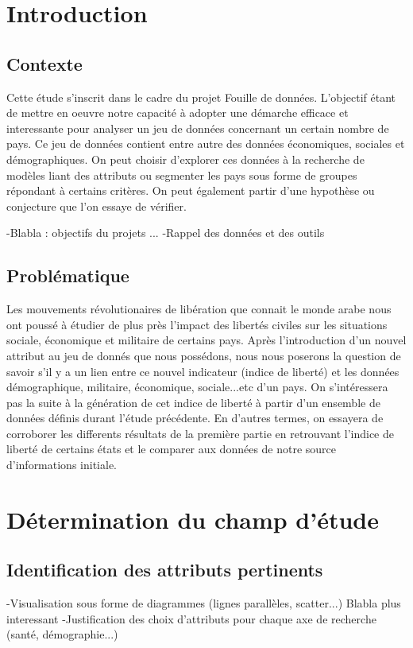 \section{Introduction}

\subsection{Contexte}
Cette étude s'inscrit dans le cadre du projet Fouille de données. L'objectif étant de mettre en oeuvre notre capacité à adopter une démarche efficace et interessante pour analyser un jeu de données concernant un certain nombre de pays.
Ce jeu de données contient entre autre des données économiques, sociales et démographiques. On peut choisir d'explorer ces données à la recherche de modèles liant des attributs ou segmenter les pays sous forme de groupes répondant à certains critères. On peut également partir d'une hypothèse ou conjecture que l'on essaye de vérifier.  

-Blabla : objectifs du projets ...
-Rappel des données et des outils
\subsection{Problématique}
Les mouvements révolutionaires de libération que connait le monde arabe nous ont poussé à étudier de plus près l'impact des libertés civiles sur les situations sociale, économique et militaire de certains pays.
Après l'introduction d'un nouvel attribut au jeu de donnés que nous possédons, nous nous poserons la question de savoir s'il y a un lien entre ce nouvel indicateur (indice de liberté) et les données démographique, militaire, économique, sociale...etc d'un pays.
On s'intéressera pas la suite à la génération de cet indice de liberté à partir d'un ensemble de données définis durant l'étude précédente. En d'autres termes, on essayera de corroborer les differents résultats de la première partie en retrouvant l'indice de liberté de certains états et le comparer aux données de notre source d'informations initiale.

\section{Détermination du champ d'étude}
\subsection{Identification des attributs pertinents}
-Visualisation sous forme de diagrammes (lignes parallèles, scatter...)
Blabla plus interessant
-Justification des choix d'attributs pour chaque axe de recherche (santé, démographie...)
